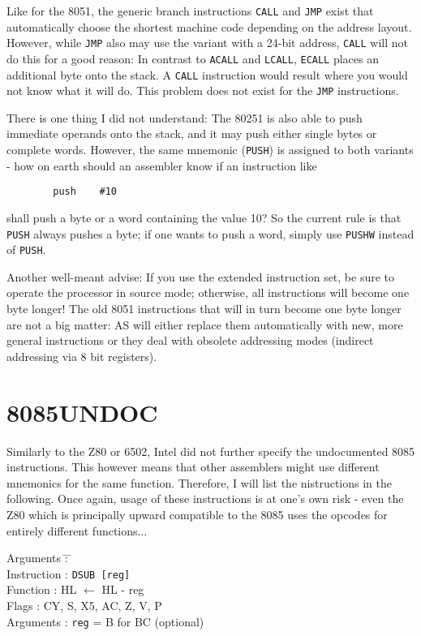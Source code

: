 \documentclass[12pt,twoside]{report}
\newcommand{\tty}[1]{{\tt #1}}
\begin{document}
Like for the 8051, the generic branch instructions \tty{CALL} and
\tty{JMP} exist that automatically choose the shortest machine code
depending on the address layout.  However, while \tty{JMP} also may use
the variant with a 24-bit address, \tty{CALL} will not do this for a good
reason: In contrast to \tty{ACALL} and \tty{LCALL}, \tty{ECALL} places an
additional byte onto the stack.  A \tty{CALL} instruction would result where
you would not know what it will do.  This problem does not exist for the
\tty{JMP} instructions.

There is one thing I did not understand: The 80251 is also able to
push immediate operands onto the stack, and it may push either single
bytes or complete words.  However, the same mnemonic (\tty{PUSH}) is
assigned to both variants - how on earth should an assembler know if
an instruction like
\begin{verbatim}
        push    #10
\end{verbatim}
shall push a byte or a word containing the value 10?  So the current
rule is that \tty{PUSH} always pushes a byte; if one wants to push a word,
simply use \tty{PUSHW} instead of \tty{PUSH}.

Another well-meant advise: If you use the extended instruction set,
be sure to operate the processor in source mode; otherwise, all
instructions will become one byte longer!  The old 8051 instructions
that will in turn become one byte longer are not a big matter:  AS
will either replace them automatically with new, more general
instructions or they deal with obsolete addressing modes (indirect
addressing via 8 bit registers).


\section{8085UNDOC}
\label{8085Spec}

Similarly to the Z80 or 6502, Intel did not further specify the
undocumented 8085 instructions.  This however means that other assemblers
might use different mnemonics for the same function.  Therefore, I will
list the nistructions in the following.  Once again, usage of these
instructions is at one's own risk - even the Z80 which is principally
upward compatible to the 8085 uses the opcodes for entirely different
functions...

\begin{tabbing}
Arguments         \= : \= \kill \\
Instruction       \> : \> \tty{DSUB [reg]} \\
Function          \> : \> HL $\leftarrow$ HL - reg \\
Flags             \> : \> CY, S, X5, AC, Z, V, P \\
Arguments         \> : \> \tty{reg} = B for BC (optional) \\
\end{tabbing}
\end{document}
